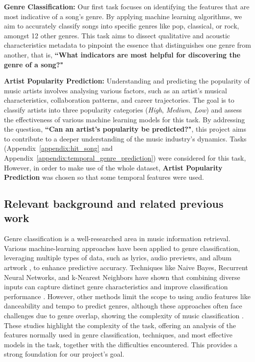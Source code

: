 \documentclass{article}
\begin{document}
\textbf{Genre Classification:} Our first task focuses on identifying the features that are most indicative of a song's genre. By applying machine learning algorithms, we aim to accurately classify songs into specific genres like pop, classical, or rock, amongst 12 other genres. This task aims to dissect qualitative and acoustic characteristics metadata to pinpoint the essence that distinguishes one genre from another, that is, \textbf{``What indicators are most helpful for discovering the genre of a song?"}

\textbf{Artist Popularity Prediction:} Understanding and predicting the popularity of music artists involves analysing various factors, such as an artist's musical characteristics, collaboration patterns, and career trajectories. The goal is to classify artists into three popularity categories (\textit{High}, \textit{Medium}, \textit{Low}) and assess the effectiveness of various machine learning models for this task. By addressing the question, \textbf{``Can an artist's popularity be predicted?"}, this project aims to contribute to a deeper understanding of the music industry's dynamics.
Tasks (Appendix~\ref{appendix:hit_song} and Appendix~\ref{appendix:temporal_genre_prediction}) were considered for this task, However, in order to make use of the whole dataset, \textbf{Artist Popularity Prediction} was chosen so that some temporal features were used.
  
\subsection{Relevant background and related previous work}

Genre classification is a well-researched area in music information retrieval. Various machine-learning approaches have been applied to genre classification, leveraging multiple types of data, such as lyrics, audio previews, and album artwork \cite{dammann2017genre}, to enhance predictive accuracy. Techniques like Naive Bayes, Recurrent Neural Networks, and k-Nearest Neighbors have shown that combining diverse inputs can capture distinct genre characteristics and improve classification performance \cite{werner2020organizing}. However, other methods limit the scope to using audio features like danceability and tempo to predict genres, although these approaches often face challenges due to genre overlap, showing the complexity of music classification \cite{hendri2024comparation}. These studies highlight the complexity of the task, offering an analysis of the features normally used in genre classification, techniques, and most effective models in the task, together with the difficulties encountered. This provides a strong foundation for our project’s goal.
\end{document}
